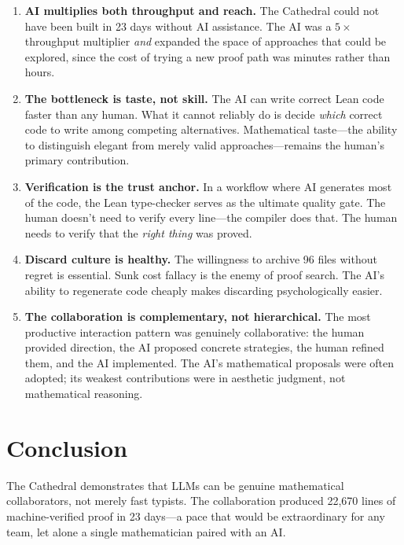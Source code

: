 \documentclass[11pt,a4paper]{article}
\begin{document}
\begin{enumerate}
  \item \textbf{AI multiplies both throughput and reach.} The
    Cathedral could not have been built in 23 days without AI
    assistance. The AI was a $5\times$ throughput multiplier
    \emph{and} expanded the space of approaches that could be
    explored, since the cost of trying a new proof path was
    minutes rather than hours.

  \item \textbf{The bottleneck is taste, not skill.} The AI can
    write correct Lean code faster than any human. What it cannot
    reliably do is decide \emph{which} correct code to write among
    competing alternatives. Mathematical taste---the ability to
    distinguish elegant from merely valid approaches---remains
    the human's primary contribution.

  \item \textbf{Verification is the trust anchor.} In a workflow
    where AI generates most of the code, the Lean type-checker
    serves as the ultimate quality gate. The human doesn't need to
    verify every line---the compiler does that. The human needs to
    verify that the \emph{right thing} was proved.

  \item \textbf{Discard culture is healthy.} The willingness to
    archive 96 files without regret is essential. Sunk cost fallacy
    is the enemy of proof search. The AI's ability to regenerate
    code cheaply makes discarding psychologically easier.

  \item \textbf{The collaboration is complementary, not hierarchical.}
    The most productive interaction pattern was genuinely
    collaborative: the human provided direction, the AI proposed
    concrete strategies, the human refined them, and the AI
    implemented. The AI's mathematical proposals were often adopted;
    its weakest contributions were in aesthetic judgment, not
    mathematical reasoning.
\end{enumerate}

\section{Conclusion}

The Cathedral demonstrates that LLMs can be genuine mathematical
collaborators, not merely fast typists. The collaboration produced
22,670 lines of machine-verified proof in 23 days---a pace that
would be extraordinary for any team, let alone a single
mathematician paired with an AI.
\end{document}
